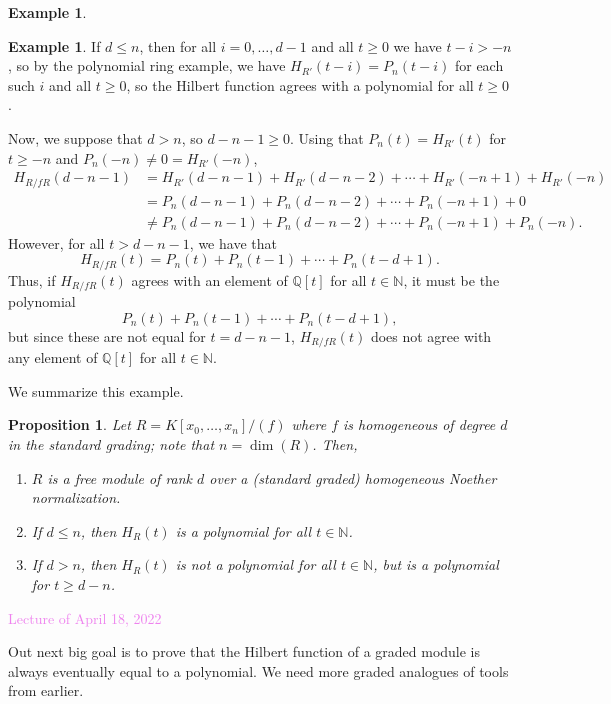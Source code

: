 \documentclass{amsart}[12pt]
\newcommand{\Apr}[1]{\textcolor{violet}{Lecture of April #1, 2022}}
\newcommand{\Q}{\mathbb{Q}}
\newcommand{\NN}{\mathbb{N}}
\numberwithin{equation}{section}
\theoremstyle{plain} %
\newtheorem{proposition}[equation]{Proposition}
\theoremstyle{definition}
\newtheorem{ex}[equation]{Example}
\newtheorem{example}[equation]{Example}
\theoremstyle{remark}
\begin{document}
\begin{ex}
\begin{example}
If $d\leq n$, then for all $i=0,\dots,d-1$ and all $t\geq 0$ we have $t-i >-n$, so by the polynomial ring example, we have $H_{R'}(t-i)=P_n(t-i)$ for each such $i$ and all $t\geq 0$, so the Hilbert function agrees with a polynomial for all $t\geq 0$.

Now, we suppose that $d>n$, so  $d-n-1\geq 0$. Using that $P_n(t)=H_{R'}(t)$ for $t\geq -n$ and $P_n(-n)\neq 0 = H_{R'}(-n)$,
\[\begin{aligned} H_{R/fR}(d-n-1)&= H_{R'}(d-n-1) + H_{R'}(d-n-2) + \cdots + H_{R'}(-n+1)  + H_{R'}(-n) \\
&= P_n(d-n-1) + P_n(d-n-2) + \cdots + P_n(-n+1) +0 \\
&\neq  P_n(d-n-1) + P_n(d-n-2) + \cdots + P_n(-n+1) +P_n(-n). \end{aligned}\]
However, for all $t>d-n-1$, we have that
\[ H_{R/fR}(t) = P_n(t) + P_n(t-1) + \cdots + P_n(t-d+1).\]
Thus, if $H_{R/fR}(t)$ agrees with an element of $\Q[t]$ for all $t\in \NN$, it must be the polynomial \[P_n(t) + P_n(t-1) + \cdots + P_n(t-d+1),\] but since these are not equal for $t=d-n-1$, $H_{R/fR}(t)$ does not agree with any element of $\Q[t]$ for all $t\in \NN$.
\end{example}



We summarize this example.

\begin{proposition}
	Let $R=K[x_0,\dots,x_n]/(f)$ where $f$ is homogeneous of degree $d$ in the standard grading; note that $n=\dim(R)$. Then,
	\begin{enumerate}
		\item $R$ is a free module of rank $d$ over a (standard graded) homogeneous Noether normalization.
		\item If $d\leq n$, then $H_R(t)$ is a polynomial for all $t\in \NN$.
		\item If $d > n$, then $H_R(t)$ is not a polynomial for all $t \in \NN$, but is a polynomial for $t\geq d-n$.
	\end{enumerate}
\end{proposition}



\Apr{18}


Out next big goal is to prove that the Hilbert function of a graded module is always eventually equal to a polynomial. We need more graded analogues of tools from earlier.


\end{ex}
\end{document}
